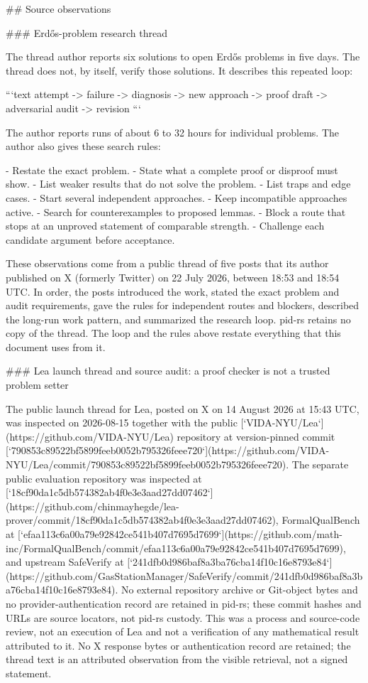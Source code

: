 \documentclass[11pt]{article}
\begin{document}
\begin{markdown}
## Source observations

### Erdős-problem research thread

The thread author reports six solutions to open Erdős problems in five days. The thread does not, by
itself, verify those solutions. It describes this repeated loop:

```text
attempt -> failure -> diagnosis -> new approach -> proof draft -> adversarial audit -> revision
```

The author reports runs of about 6 to 32 hours for individual problems. The author also gives these
search rules:

- Restate the exact problem.
- State what a complete proof or disproof must show.
- List weaker results that do not solve the problem.
- List traps and edge cases.
- Start several independent approaches.
- Keep incompatible approaches active.
- Search for counterexamples to proposed lemmas.
- Block a route that stops at an unproved statement of comparable strength.
- Challenge each candidate argument before acceptance.

These observations come from a public thread of five posts that its author published on X (formerly
Twitter) on 22 July 2026, between 18:53 and 18:54 UTC. In order, the posts introduced the work,
stated the exact problem and audit requirements, gave the rules for independent routes and
blockers, described the long-run work pattern, and summarized the research loop. pid-rs retains no
copy of the thread. The loop and the rules above restate everything that this document uses from
it.

### Lea launch thread and source audit: a proof checker is not a trusted problem setter

The public launch thread for Lea, posted on X on 14 August 2026 at 15:43 UTC, was inspected on
2026-08-15 together with the public
[`VIDA-NYU/Lea`](https://github.com/VIDA-NYU/Lea) repository at version-pinned commit
[`790853c89522bf5899feeb0052b795326feee720`](https://github.com/VIDA-NYU/Lea/commit/790853c89522bf5899feeb0052b795326feee720).
The separate public evaluation repository was inspected at
[`18cf90da1c5db574382ab4f0e3e3aad27dd07462`](https://github.com/chinmayhegde/lea-prover/commit/18cf90da1c5db574382ab4f0e3e3aad27dd07462),
FormalQualBench at
[`efaa113c6a00a79e92842ce541b407d7695d7699`](https://github.com/math-inc/FormalQualBench/commit/efaa113c6a00a79e92842ce541b407d7695d7699),
and upstream SafeVerify at
[`241dfb0d986baf8a3ba76cba14f10c16e8793e84`](https://github.com/GasStationManager/SafeVerify/commit/241dfb0d986baf8a3ba76cba14f10c16e8793e84).
No external repository archive or Git-object bytes and no provider-authentication record are
retained in pid-rs; these commit hashes and URLs are source locators, not pid-rs custody.
This was a process and source-code review, not an execution of Lea and not a verification of any
mathematical result attributed to it. No X response bytes or authentication record are retained;
the thread text is an attributed observation from the visible retrieval, not a signed statement.


\end{markdown}
\end{document}
